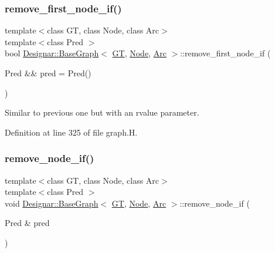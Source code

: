 \subsubsection{\texorpdfstring{remove\+\_\+first\+\_\+node\+\_\+if()}{remove\_first\_node\_if()}\hspace{0.1cm}{\footnotesize\ttfamily [2/2]}}
{\footnotesize\ttfamily template$<$class GT, class Node, class Arc$>$ \\
template$<$class Pred $>$ \\
bool \hyperlink{class_designar_1_1_base_graph}{Designar\+::\+Base\+Graph}$<$ \hyperlink{demo-buildgraph_8_c_a3001c40d2c31ca87ed96cd7d1334a55e}{GT}, \hyperlink{namespace_designar_a5af326c65aa2bd26b26c410f2030d09e}{Node}, \hyperlink{namespace_designar_a3f55fb5513d62ff47cbc8f72b8e95d6f}{Arc} $>$\+::remove\+\_\+first\+\_\+node\+\_\+if (\begin{DoxyParamCaption}\item[{Pred \&\&}]{pred = {\ttfamily Pred()} }\end{DoxyParamCaption})\hspace{0.3cm}{\ttfamily [inline]}}



Similar to previous one but with an rvalue parameter. 



Definition at line 325 of file graph.\+H.

\mbox{\label{class_designar_1_1_base_graph_aae56ca6b3b936835d07275f2ceb4b0d1}} 
\subsubsection{\texorpdfstring{remove\+\_\+node\+\_\+if()}{remove\_node\_if()}\hspace{0.1cm}{\footnotesize\ttfamily [1/2]}}
{\footnotesize\ttfamily template$<$class GT, class Node, class Arc$>$ \\
template$<$class Pred $>$ \\
void \hyperlink{class_designar_1_1_base_graph}{Designar\+::\+Base\+Graph}$<$ \hyperlink{demo-buildgraph_8_c_a3001c40d2c31ca87ed96cd7d1334a55e}{GT}, \hyperlink{namespace_designar_a5af326c65aa2bd26b26c410f2030d09e}{Node}, \hyperlink{namespace_designar_a3f55fb5513d62ff47cbc8f72b8e95d6f}{Arc} $>$\+::remove\+\_\+node\+\_\+if (\begin{DoxyParamCaption}\item[{Pred \&}]{pred }\end{DoxyParamCaption})\hspace{0.3cm}{\ttfamily [inline]}}



